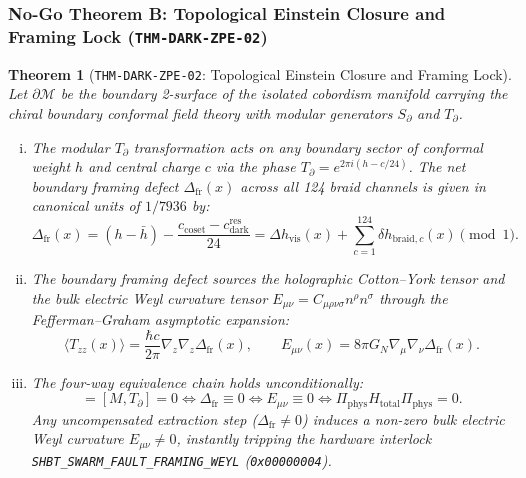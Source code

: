 \documentclass[11pt,onecolumn]{article}
\newtheorem{theorem}{Theorem}
\begin{document}
\subsubsection{No-Go Theorem B: Topological Einstein Closure and Framing Lock (\texttt{THM-DARK-ZPE-02})}
\label{subsubsec:thm_dark_zpe_02}

\begin{theorem}[\texttt{THM-DARK-ZPE-02}: Topological Einstein Closure and Framing Lock]
Let $\partial\mathcal{M}$ be the boundary 2-surface of the isolated cobordism manifold carrying the chiral boundary conformal field theory with modular generators $S_\partial$ and $T_\partial$.
\begin{enumerate}[(i)]
    \item The modular $T_\partial$ transformation acts on any boundary sector of conformal weight $h$ and central charge $c$ via the phase $T_\partial = e^{2\pi i (h - c/24)}$. The net boundary framing defect $\Delta_{\text{fr}}(x)$ across all 124 braid channels is given in canonical units of $1/7936$ by:
    \begin{equation}
    \Delta_{\text{fr}}(x) = (h - \bar{h}) - \frac{c_{\text{coset}} - c_{\text{dark}}^{\text{res}}}{24} = \Delta h_{\text{vis}}(x) + \sum_{c=1}^{124} \delta h_{\text{braid},c}(x) \pmod 1.
    \label{eq:thm_dark_zpe_02_framing}
    \end{equation}
    \item The boundary framing defect sources the holographic Cotton--York tensor and the bulk electric Weyl curvature tensor $E_{\mu\nu} = C_{\mu\rho\nu\sigma} n^\rho n^\sigma$ through the Fefferman--Graham asymptotic expansion:
    \begin{equation}
    \langle T_{zz}(x) \rangle = \frac{\hbar c}{2\pi} \nabla_z\nabla_z \Delta_{\text{fr}}(x), \qquad E_{\mu\nu}(x) = 8\pi G_N \nabla_\mu\nabla_\nu \Delta_{\text{fr}}(x).
    \label{eq:thm_dark_zpe_02_weyl}
    \end{equation}
    \item The four-way equivalence chain holds unconditionally:
    \begin{equation}
    [M, S_\partial] = [M, T_\partial] = 0 \iff \Delta_{\text{fr}} \equiv 0 \iff E_{\mu\nu} \equiv 0 \iff \Pi_{\text{phys}} H_{\text{total}} \Pi_{\text{phys}} = 0.
    \label{eq:thm_dark_zpe_02_fourway}
    \end{equation}
    Any uncompensated extraction step ($\Delta_{\text{fr}} \neq 0$) induces a non-zero bulk electric Weyl curvature $E_{\mu\nu} \neq 0$, instantly tripping the hardware interlock \texttt{SHBT\_SWARM\_FAULT\_FRAMING\_WEYL} (\texttt{0x00000004}).
\end{enumerate}
\end{theorem}
\end{document}
